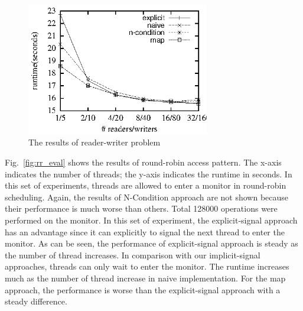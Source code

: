 \documentclass[10pt, conference, compsocconf]{IEEEtran}
\begin{document}
\begin{figure}[ht!]
  \centering
  \includegraphics[width=80mm]{fig/rw.eps}
  \caption{The results of reader-writer problem}
  \label{fig:rw_eval}
\end{figure}


%
Fig.~\ref{fig:rr_eval} shows the results of round-robin access pattern. The
x-axis indicates the number of threads; the y-axis indicates the
runtime in seconds. In this set of experiments, threads are allowed to enter a
monitor in round-robin scheduling. Again, the results of N-Condition approach
are not shown because their performance is much worse than others. Total 
128000 operations were performed on the monitor. In this set
of experiment, the explicit-signal approach has an advantage since it can
explicitly to signal the next thread to enter the monitor. As can be seen, the
performance of explicit-signal approach is steady as the number of thread
increases. In comparison with our implicit-signal approaches, threads can only 
wait to enter the monitor. The runtime increases much as the number of thread 
increase in naive implementation. For the map approach, the performance is 
worse than the explicit-signal approach with a steady difference. 
\end{document}
